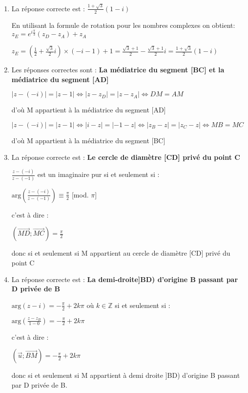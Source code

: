 \begin{corrige}
     \begin{enumerate}
          \item
          La réponse correcte est : $\frac{1+\sqrt{3}}{2}\left(1-i\right)$
          \par
          En utilisant la formule de rotation pour les nombres complexes on obtient: $z_{E}=e^{i\frac{\pi }{3}}\left(z_{D}-z_{A}\right)+z_{A}$
          \par
          $z_{E}=\left(\frac{1}{2}+\frac{\sqrt{3}}{2}i\right)\times \left(-i-1\right)+1=\frac{\sqrt{3}+1}{2}-\frac{\sqrt{3}+1}{2}i=\frac{1+\sqrt{3}}{2}\left(1-i\right)$
          \item
          Les réponses correctes sont : \textbf{La médiatrice du segment [BC] et la médiatrice du segment [AD]}
\par
          $|z-\left(-i\right)|=|z-1|\Leftrightarrow |z-z_{D}|=|z-z_{A}|\Leftrightarrow DM=AM$
          \par
          d'où M appartient à la médiatrice du segment [AD]
          \par
          $|z-\left(-i\right)|=|z-1|\Leftrightarrow |i-z|=|-1-z|\Leftrightarrow |z_{B}-z|=|z_{C}-z|\Leftrightarrow MB=MC$
          \par
          d'où M appartient à la médiatrice du segment [BC]
          \item
          La réponse correcte est : \textbf{Le cercle de diamètre [CD] privé du point C}
\par
          $\frac{z-\left(-i\right)}{z-\left(-1\right)}$ est un imaginaire pur si et seulement si :
          \par
          $\text{arg}\left(\frac{z-\left(-i\right)}{z-\left(-1\right)}\right)\equiv \frac{\pi }{2}$ [mod. $\pi $]
          \par
          c'est à dire :
          \par
          $\left(\overrightarrow{MD};\overrightarrow{MC}\right)=\frac{\pi }{2}$
          \par
          donc si et seulement si M appartient au cercle de diamètre [CD] privé du point C
          \item
          La réponse correcte est : \textbf{La demi-droite]BD) d'origine B passant par D privée de B}
\par
          $\text{arg}\left(z-i\right)=-\frac{\pi }{2}+2k\pi $ où $k\in \mathbb{Z}$ si et seulement si :
          \par
          $\text{arg}\left(\frac{z-z_{B}}{1-0}\right)=-\frac{\pi }{2}+2k\pi $
          \par
          c'est à dire :
          \par
          $\left(\vec{u};\overrightarrow{BM}\right)=-\frac{\pi }{2}+2k\pi $
          \par
          donc si et seulement si M appartient à demi droite ]BD) d'origine B passant par D privée de B.
     \end{enumerate}
\end{corrige}
